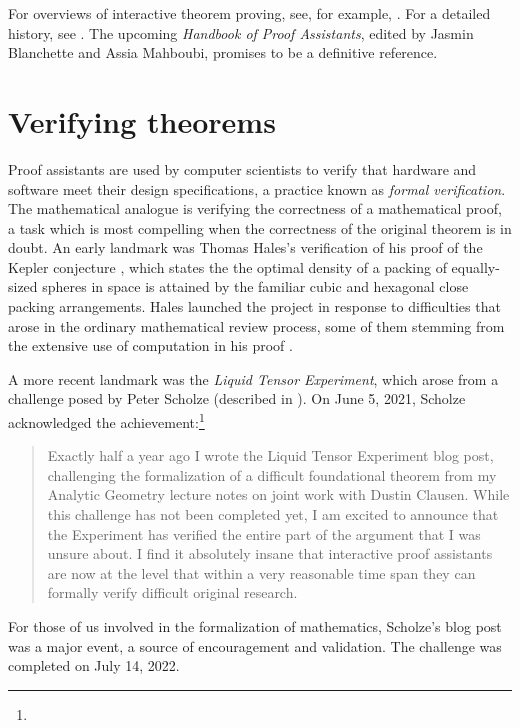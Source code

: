 \documentclass{amsart}
\theoremstyle{definition}
\theoremstyle{remark}
\numberwithin{equation}{section}
\begin{document}
For overviews of interactive theorem proving, see, for example, \cite{avigad:harrison:14,buzzard:20,hales:15}. For a detailed history, see \cite{harrison:urban:wiedijk:14}. The upcoming \emph{Handbook of Proof Assistants}, edited by Jasmin Blanchette and Assia Mahboubi, promises to be a definitive reference.


\section{Verifying theorems}

Proof assistants are used by computer scientists to verify that hardware and software meet their design specifications, a practice known as \emph{formal verification}. The mathematical analogue is verifying the correctness of a mathematical proof, a task which is most compelling when the correctness of the original theorem is in doubt. An early landmark was Thomas Hales's verification of his proof of the Kepler conjecture \cite{hales:05}, which states the the optimal density of a packing of equally-sized spheres in space is attained by the familiar cubic and hexagonal close packing arrangements. Hales launched the project in response to difficulties that arose in the ordinary mathematical review process, some of them stemming from the extensive use of computation in his proof \cite{hales:et:al:17}.

A more recent landmark was the \emph{Liquid Tensor Experiment}, which arose from a challenge posed by Peter Scholze (described in \cite{castelvecchi:21}).
On June 5, 2021, Scholze acknowledged the achievement:\footnote{}
\begin{quote}
Exactly half a year ago I wrote the Liquid Tensor Experiment blog post, challenging the formalization of a difficult foundational theorem from my Analytic Geometry lecture notes on joint work with Dustin Clausen. While this challenge has not been completed yet, I am excited to announce that the Experiment has verified the entire part of the argument that I was unsure about. I find it absolutely insane that interactive proof assistants are now at the level that within a very reasonable time span they can formally verify difficult original research.
\end{quote}
For those of us involved in the formalization of mathematics, Scholze's blog post was a major event, a source of encouragement and validation. The challenge was completed on July 14, 2022.
\end{document}

